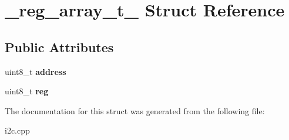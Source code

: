 \hypertarget{struct__reg__array__t__}{}\section{\+\_\+reg\+\_\+array\+\_\+t\+\_\+ Struct Reference}
\label{struct__reg__array__t__}
\subsection*{Public Attributes}
\begin{DoxyCompactItemize}
\item 
\mbox{\label{struct__reg__array__t___a3a550aa5c87a58a85e65a980b0d6f023}} 
uint8\+\_\+t {\bfseries address}
\item 
\mbox{\label{struct__reg__array__t___a48e98448b40659966f335c7a251efb05}} 
uint8\+\_\+t {\bfseries reg}
\end{DoxyCompactItemize}


The documentation for this struct was generated from the following file\+:\begin{DoxyCompactItemize}
\item 
i2c.\+cpp\end{DoxyCompactItemize}
